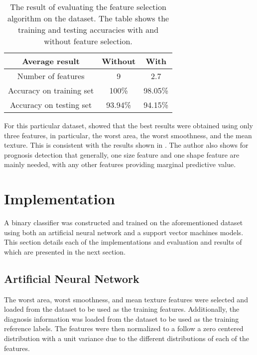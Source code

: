 \documentclass[twocolumn]{article}
\begin{document}
\begin{table}
\begin{center}
\begin{tabular}{ccc}
\toprule
Average result & Without & With \\
\midrule
Number of features & 9 & 2.7 \\
Accuracy on training set & 100\% & 98.05\% \\
Accuracy on testing set & 93.94\% & 94.15\% \\
\bottomrule
\end{tabular}
\end{center}
\caption{The result of evaluating the feature selection algorithm on the
  dataset. The table shows the training and testing accuracies with and without
  feature selection.}
\label{tab:FeatureSelectionAccuracy}
\end{table}

For this particular dataset, \autocite{Mandelbrot1982} showed that the best
results were obtained using only three features, in particular, the worst area,
the worst smoothness, and the mean texture. This is consistent with the results
shown in . The author also shows for
prognosis detection that generally, one size feature and one shape feature are
mainly needed, with any other features providing marginal predictive value.

\section{Implementation}
\label{sec:Implementation}

A binary classifier was constructed and trained on the aforementioned dataset
using both an artificial neural network and a support vector machines models.
This section details each of the implementations and evaluation and results of
which are presented in the next section.

\subsection{Artificial Neural Network}

The worst area, worst smoothness, and mean texture features were selected and
loaded from the dataset to be used as the training features. Additionally, the
diagnosis information was loaded from the dataset to be used as the training
reference labels. The features were then normalized to a follow a zero centered
distribution with a unit variance due to the different distributions of each of
the features.
\end{document}
